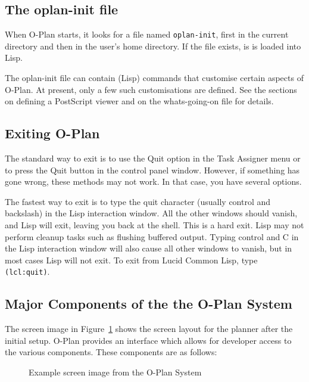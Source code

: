 \subsection{The oplan-init file}
When O-Plan starts, it looks for a file named {\tt oplan-init}, first
in the current directory and then in the user's home directory.  If
the file exists, is is loaded into Lisp.

The oplan-init file can contain (Lisp) commands that customise
certain aspects of O-Plan.  At present, only a few such
customisations are defined.  See the sections on defining a PostScript
viewer and on the whats-going-on file for details.

\subsection{Exiting O-Plan}
The standard way to exit is to use the Quit option in the Task
Assigner menu or to press the Quit button in the control panel
window.  However, if something has gone wrong, these methods may
not work.  In that case, you have several options.

The fastest way to exit is to type the quit character (usually control
and backslash) in the Lisp interaction window.  All the other windows
should vanish, and Lisp will exit, leaving you back at the shell.
This is a hard exit.  Lisp may not perform cleanup tasks such as
flushing buffered output.  Typing control and C in the Lisp
interaction window will also cause all other windows to vanish, but in
most cases Lisp will not exit.  To exit from Lucid Common Lisp, type
{\tt (lcl:quit)}.

\subsection{\protect\label{major}Major Components of the the
O-Plan System} 

The screen image in Figure~\ref{screen-dump} shows the screen layout
for the planner after the initial setup. O-Plan provides an
interface which allows for developer access to the various components.
These components are as follows:

\begin{figure}[htb]
\vspace{12.5cm}
\caption{Example screen image from the O-Plan System}
\label{screen-dump}
\end{figure}

